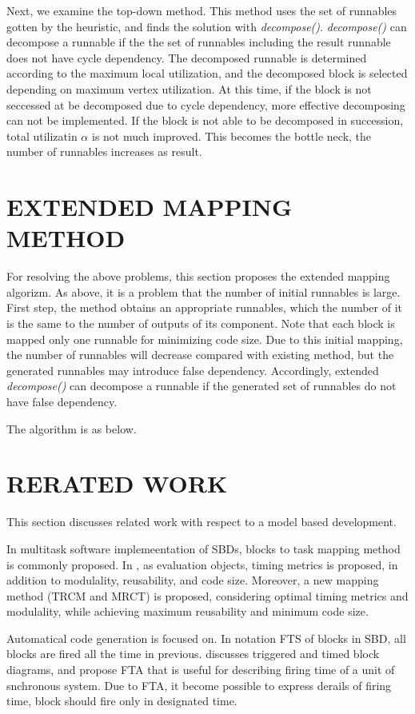 \documentclass[conference,compsoc]{IEEEtran}
\begin{document}
Next, we examine the top-down method.
This method uses the set of runnables gotten by the heuristic, and finds the solution with {\it decompose()}.
{\it decompose()} can decompose a runnable if the the set of runnables including the result runnable does not have cycle dependency.
The decomposed runnable is determined according to the maximum local utilization, and the decomposed block is selected depending on maximum vertex utilization.
At this time, if the block is not seccessed at be decomposed due to cycle dependency, more effective decomposing can not be implemented.
If the block is not able to be decomposed in succession, total utilizatin $\alpha$ is not much improved.
This becomes the bottle neck, the number of runnables increases as result.

\section{EXTENDED MAPPING METHOD}
 For resolving the above problems, this section proposes the extended mapping algorizm.
As above, it is a problem that the number of initial runnables is large.
First step, the method obtains an appropriate runnables, which the number of it is the same to the number of outputs of its component.
Note that each block is mapped only one runnable for minimizing code size.
Due to this initial mapping, the number of runnables will decrease compared with existing method, but the generated runnables may introduce false dependency.
Accordingly, extended {\it decompose()} can decompose a runnable if the generated set of runnables do not have false dependency.

The algorithm is as below.


\section{RERATED WORK}
 This section discusses related work with respect to a model based development.

 In multitask software implemeentation of SBDs, blocks to task mapping method is commonly proposed.
In \cite{6871195}, as evaluation objects, timing metrics is proposed, in addition to modulality, reusability, and code size.
Moreover, a new mapping method (TRCM and MRCT) is proposed, considering optimal timing metrics and modulality, while achieving maximum reusability and minimum code size. 

 Automatical code generation is focused on.
In notation FTS of blocks in SBD, all blocks are fired all the time in previous. 
\cite{4550788} discusses triggered and timed block diagrams, and propose FTA that is useful for describing firing time of a unit of snchronous system.
Due to FTA, it become possible to express derails of firing time, block should fire only in designated time.
\end{document}

